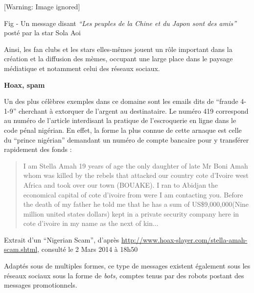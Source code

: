   [Warning: Image ignored] %
 

Fig - Un message disant\textit{ {\textquotedblleft}Les peuples de la
Chine et du Japon sont des amis{\textquotedblright} }post\'e par la
star Sola Aoi

Ainsi, les fan clubs et les stars elles-m\^emes jouent un r\^ole
important dans la cr\'eation et la diffusion des m\`emes, occupant une
large place dans le paysage m\'ediatique et notamment celui des
r\'eseaux sociaux. 

\textbf{Hoax, spam}

Un des plus c\'el\`ebres exemples dans ce domaine sont les emails dits
de {\textquotedblleft}fraude 4-1-9{\textquotedblright} cherchant \`a
extorquer de l{\textquoteright}argent au destinataire. Le num\'ero 419
correspond au num\'ero de l{\textquoteright}article interdisant la
pratique de l{\textquoteright}escroquerie en ligne dans le code p\'enal
nig\'erian. En effet, la forme la plus connue de cette arnaque est
celle du {\textquotedblleft}prince nig\'erian{\textquotedblright}
demandant un num\'ero de compte bancaire pour y transf\'erer rapidement
des fonds : 

\begin{quote}
I am Stella Amah 19 years of age the only daughter of late Mr Boni Amah whom was killed by the rebels that attacked our country cote d'Ivoire west Africa and took over our town (BOUAKE). I ran to Abidjan the economical capital of cote d'ivoire from were I am contacting you. Before the death of my father he told me that he has a sum of US\$9,000,000(Nine million united states dollars) kept in a private security company here in cote d'ivoire in my name as the next of kin... 
\end{quote}

Extrait d{\textquoteright}un {\textquotedblleft}Nigerian
Scam{\textquotedblright}, d{\textquoteright}apr\`es
\url{http://www.hoax-slayer.com/stella-amah-scam.shtml,} consult\'e le
2 Mars 2014 \`a 18h50

Adapt\'es sous de multiples formes, ce type de messages existent
\'egalement sous les r\'eseaux sociaux sous la forme de \textit{bots,
}comptes tenus par des robots postant des messages promotionnels. 

